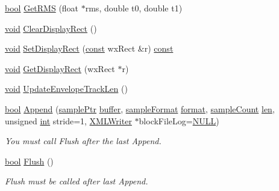 \begin{DoxyCompactItemize}
\item 
\hyperlink{mac_2config_2i386_2lib-src_2libsoxr_2soxr-config_8h_abb452686968e48b67397da5f97445f5b}{bool} \hyperlink{class_wave_clip_a90c059a7d3c13082e8782f162268cc01}{Get\+R\+MS} (float $\ast$rms, double t0, double t1)
\item 
\hyperlink{sound_8c_ae35f5844602719cf66324f4de2a658b3}{void} \hyperlink{class_wave_clip_a785650ce7b0f65b7f6b51717dcf438a1}{Clear\+Display\+Rect} ()
\item 
\hyperlink{sound_8c_ae35f5844602719cf66324f4de2a658b3}{void} \hyperlink{class_wave_clip_ac42da9000a368776ef8beb582723fb29}{Set\+Display\+Rect} (\hyperlink{getopt1_8c_a2c212835823e3c54a8ab6d95c652660e}{const} wx\+Rect \&r) \hyperlink{getopt1_8c_a2c212835823e3c54a8ab6d95c652660e}{const} 
\item 
\hyperlink{sound_8c_ae35f5844602719cf66324f4de2a658b3}{void} \hyperlink{class_wave_clip_a7df6beb25e45b947900c40744a6fc968}{Get\+Display\+Rect} (wx\+Rect $\ast$r)
\item 
\hyperlink{sound_8c_ae35f5844602719cf66324f4de2a658b3}{void} \hyperlink{class_wave_clip_ae556d0166bde7df46315757f6451d671}{Update\+Envelope\+Track\+Len} ()
\item 
\hyperlink{mac_2config_2i386_2lib-src_2libsoxr_2soxr-config_8h_abb452686968e48b67397da5f97445f5b}{bool} \hyperlink{class_wave_clip_a3f1bee3270d0e6edb160be180b42fe20}{Append} (\hyperlink{include_2audacity_2_types_8h_aaafb46d1caf7c79262fec96b577215fe}{sample\+Ptr} \hyperlink{structbuffer}{buffer}, \hyperlink{include_2audacity_2_types_8h_a9938d2e2f6adef23e745cd80ef379792}{sample\+Format} \hyperlink{_export_p_c_m_8cpp_a317afff57d87a89158c2b038d37b2b08}{format}, \hyperlink{include_2audacity_2_types_8h_afa427e1f521ea5ec12d054e8bd4d0f71}{sample\+Count} \hyperlink{lib_2expat_8h_af86d325fecfc8f47b61fbf5a5146f582}{len}, unsigned \hyperlink{xmltok_8h_a5a0d4a5641ce434f1d23533f2b2e6653}{int} stride=1, \hyperlink{class_x_m_l_writer}{X\+M\+L\+Writer} $\ast$block\+File\+Log=\hyperlink{px__mixer_8h_a070d2ce7b6bb7e5c05602aa8c308d0c4}{N\+U\+LL})
\begin{DoxyCompactList}\small\item\em You must call Flush after the last Append. \end{DoxyCompactList}\item 
\hyperlink{mac_2config_2i386_2lib-src_2libsoxr_2soxr-config_8h_abb452686968e48b67397da5f97445f5b}{bool} \hyperlink{class_wave_clip_a14f42adce1fe0abf89f0bd2604a64dba}{Flush} ()
\begin{DoxyCompactList}\small\item\em Flush must be called after last Append. \end{DoxyCompactList}\item 

\end{DoxyCompactItemize}
